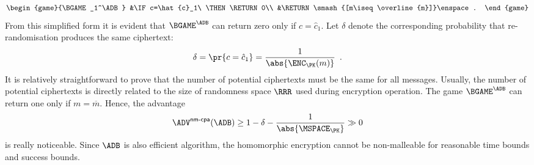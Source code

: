 \documentclass{crypto-exercise}
\begin{document}
\begin{solution}
\begin{align*}
\begin{game}{\BGAME_1^\ADB}
    &\IF c=\hat{c}_1\ \THEN \RETURN 0\\
    &\RETURN \smash{[m\iseq \overline{m}]}\enspace.
  \end{game}
\end{align*}
From this simplified form it is evident that $\BGAME^\ADB$ can return zero only if $c=\hat{c}_1$.  Let $\delta$ denote the corresponding probability that re-randomisation produces the same ciphertext:
\begin{align*}
\delta=\pr{c=\hat{c}_1}=\frac{1}{\abs{\ENC_\PK(m)}}\enspace.
\end{align*}  
It is relatively straightforward to prove that the number of potential ciphertexts must be the same for all messages. Usually, the number of potential ciphertexts is directly related to the size of randomness space $\RRR$ used during encryption operation. The game $\BGAME^\ADB$ can return one only if $m=\overline{m}$. Hence, the advantage
\begin{align*}
\advNMCPAXX{}{\ADB}\geq 1-\delta-\frac{1}{\abs{\MSPACE_\PK}}\gg 0
\end{align*} 
is really noticeable. Since $\ADB$ is also efficient algorithm, the homomorphic encryption cannot be non-malleable for reasonable time bounds and success bounds.



\end{solution}
\end{document}
